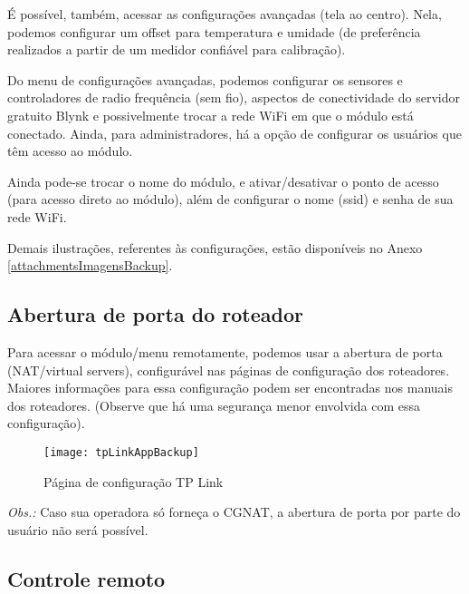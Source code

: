 É possível, também, acessar as configurações avançadas (tela ao centro). Nela, podemos configurar um offset para temperatura e umidade (de preferência realizados a partir de um medidor confiável para calibração).

Do menu de configurações avançadas, podemos configurar os sensores e controladores de radio frequência (sem fio), aspectos de conectividade do servidor gratuito Blynk e possivelmente trocar a rede WiFi em que o módulo está conectado. Ainda, para administradores, há a opção de configurar os usuários que têm acesso ao módulo.

Ainda pode-se trocar o nome do módulo, e ativar/desativar o ponto de acesso (para acesso direto ao módulo), além de configurar o nome (ssid) e senha de sua rede WiFi.

Demais ilustrações, referentes às configurações, estão disponíveis no Anexo \ref{attachmentsImagensBackup}{}.

\subsection{Abertura de porta do roteador}

Para acessar o módulo/menu remotamente, podemos usar a abertura de porta (NAT/virtual servers), configurável nas páginas de configuração dos roteadores. Maiores informações para essa configuração podem ser encontradas nos manuais dos roteadores. (Observe que há uma segurança menor envolvida com essa configuração).

\begin{figure}[hbp]
    \centering
    \caption{Página de configuração TP Link}
    \texttt{[image: tpLinkAppBackup]}
    \label{fig:plantaBackup}
\end{figure}

\emph{Obs.:} Caso sua operadora só forneça o CGNAT, a abertura de porta por parte do usuário não será possível.

\subsection{Controle remoto}

